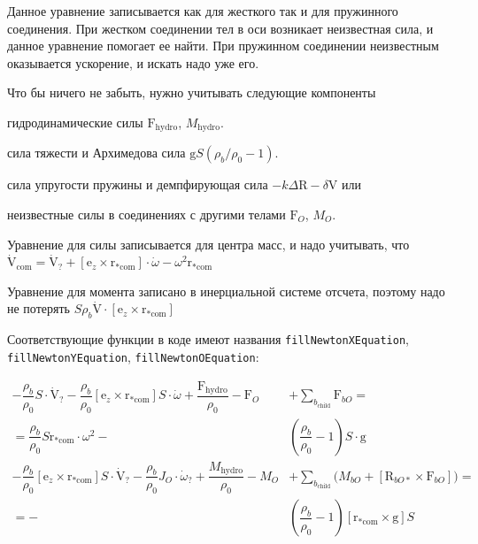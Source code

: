 \documentclass[a4paper,14pt]{extreport}
\newcommand{\br}[1]{\boldsymbol{\mathrm{#1}}}
\renewcommand{\vec}[1]{\br{#1}}
\newcommand{\com}{\text{com}}
\newenvironment{packed_itemize}{
\begin{itemize}
  \setlength{\itemsep}{1pt}
  \setlength{\parskip}{0pt}
  \setlength{\parsep}{0pt}
}{\end{itemize}}
\begin{document}
Данное уравнение записывается как для жесткого так и для пружинного соединения.
При жестком соединении тел в оси возникает неизвестная сила, и данное уравнение помогает ее найти.
При пружинном соединении неизвестным оказывается ускорение, и искать надо уже его.

Что бы ничего не забыть, нужно учитывать следующие компоненты
\begin{packed_itemize}
\item гидродинамические силы $\vec F_\text{hydro}$, $M_\text{hydro}$.
\item сила тяжести и Архимедова сила $\vec g S(\rho_b/\rho_0 - 1)$.
\item сила упругости пружины и демпфирующая сила $-k \Delta \vec R - \delta \vec V$ или
\item неизвестные силы в соединениях с другими телами $\vec F_O$, $M_O$.
\end{packed_itemize}

Уравнение для силы записывается для центра масс, и надо учитывать, что
$\dot{\vec V}_\com = \dot{\vec V}_? + [\vec e_z \times \vec r_{*\com}] \cdot\dot\omega - \omega^2 \vec r_{*\com}$

Уравнение для момента записано в инерциальной системе отсчета, поэтому надо не потерять
$S \rho_b \dot{\vec V} \cdot [\vec e_z \times \vec r_{*\com}]$

Соответствующие функции в коде имеют названия \texttt{fillNewtonXEquation}, \\\texttt{fillNewtonYEquation}, \texttt{fillNewtonOEquation}:

\begin{equation}
\label{eq_newton}
\begin{split}
- \dfrac{\rho_b}{\rho_0}S \cdot \dot {\vec V}_?
- \dfrac{\rho_b}{\rho_0} [\vec e_z \times \vec r_{*\com}]S \cdot \dot\omega
+ \dfrac{\vec F_\text{hydro}}{\rho_0}
- \vec F_O & + \sum_{b_\text{child}} \vec F_{bO} = \\
= \dfrac{\rho_b}{\rho_0}S \vec r_{*\com} \cdot \omega^2
-& \left( \dfrac{\rho_b}{\rho_0} - 1 \right)S \cdot \vec g\\
- \dfrac{\rho_b}{\rho_0} [\vec e_z \times \vec r_{*\com}]S \cdot \dot{\vec V}_?
- \dfrac{\rho_b}{\rho_0}J_O \cdot \dot \omega_?
+ \dfrac{M_\text{hydro}}{\rho_0}
- M_O& + \sum_{b_\text{child}} \bigl( M_{bO} + [\vec R_{bO*} \times \vec F_{bO}] \bigr) = \\
=
-& \left( \dfrac{\rho_b}{\rho_0} - 1 \right) [\vec r_{*\com} \times \vec g] S \\
\end{split}
\end{equation}
\end{document}
